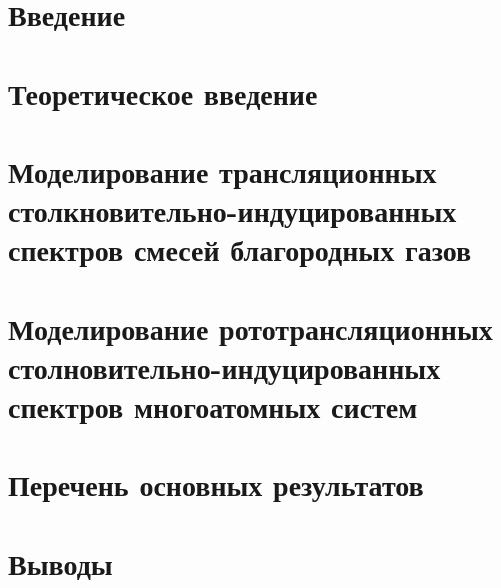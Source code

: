 \documentclass[12pt, a4paper, oneside]{extbook}
\begin{document}


\tableofcontents

\chapter{Введение}


\chapter{Теоретическое введение}


\chapter{Моделирование трансляционных столкновительно-индуцированных спектров смесей благородных газов} \label{chapter:two-atom}


\chapter{Моделирование рототрансляционных столновительно-индуцированных спектров многоатомных систем}


\chapter{Перечень основных результатов}


\chapter{Выводы}




%

\end{document}

